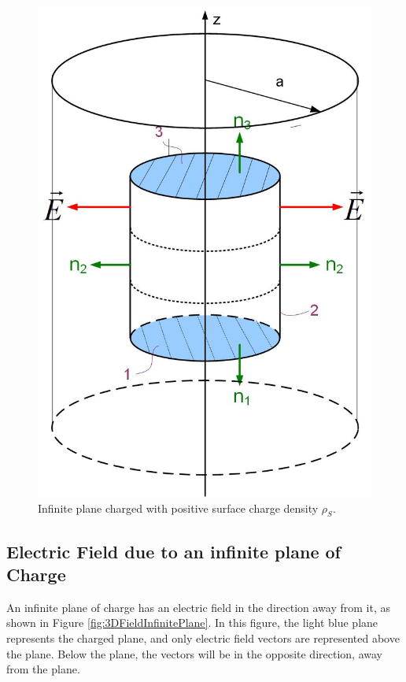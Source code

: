 \documentclass{ximera}
\begin{document}
\begin{figure}[htbp]
\begin{center}
\includegraphics[scale=0.3]{../jpg/gausslawwireInside.jpg}
\end{center}
\caption{Infinite plane charged with positive surface charge density $\rho_S$.}
\label{fig:gaussLineIn}
\end{figure}


\subsection{Electric Field due to an infinite plane of Charge}

An infinite plane of charge has an electric field in the direction away from it, as shown in Figure \ref{fig:3DFieldInfinitePlane}. In this figure, the light blue plane represents the charged plane, and only electric field vectors are represented above the plane. Below the plane, the vectors will be in the opposite direction, away from the plane. 
\end{document}
